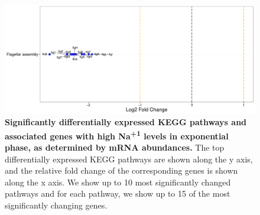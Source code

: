 \documentclass[a4paper]{article}
\begin{document}
\clearpage
\begin{figure}
	\includegraphics[width=1.0\textwidth]{../../d_figures/kegg_13.pdf}
	\caption[Significantly altered KEGG pathways for mRNA samples in exponential phase tested for high Na\textsuperscript{+1} against base Na\textsuperscript{+1}]
	{\textbf{Significantly differentially expressed KEGG pathways and associated genes with high Na\textsuperscript{+1} levels in exponential phase, as determined by mRNA abundances.} The top differentially expressed KEGG pathways are shown along the y axis, and the relative fold change of the corresponding genes is shown along the x axis. We show up to 10 most significantly changed pathways and for each pathway, we show up to 15 of the most significantly changing genes.}
\end{figure}
\end{document}
